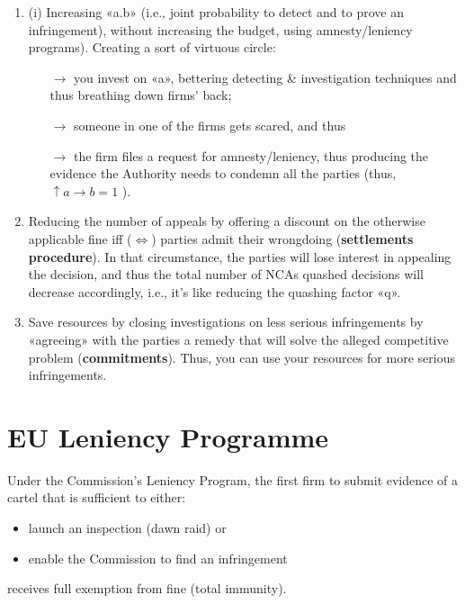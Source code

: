             \begin{enumerate}
                \item (i) Increasing «a.b» (i.e., joint probability to detect and to prove an infringement), without increasing the budget, using amnesty/leniency programs). Creating a sort of virtuous circle: 
                \begin{itemize}
                    \item[\(\rightarrow\)] you invest on «a», bettering detecting \& investigation techniques and thus breathing down firms’ back; 
                    \item[\(\rightarrow\)] someone in one of the firms gets scared, and thus
                    \item[\(\rightarrow\)]the firm files a request for amnesty/leniency, thus producing the evidence the Authority needs to condemn all the parties (thus, $\uparrow a \rightarrow b= 1$ ).
                \end{itemize}
                \item Reducing the number of appeals by offering a discount on the otherwise applicable fine iff (\(\iff\)) parties admit their wrongdoing (\textbf{settlements procedure}). In that circumstance, the parties will lose interest in appealing the decision, and thus the total number of NCAs quashed decisions will decrease accordingly, i.e., it’s like reducing the quashing factor «q».
                \item Save resources by closing investigations on less serious infringements by «agreeing» with the parties a remedy that will solve the alleged competitive problem (\textbf{commitments}). Thus, you can use your resources for more serious infringements.
            \end{enumerate}

\section{EU Leniency Programme}

    Under the Commission's Leniency Program, the first firm to submit evidence of a cartel that is sufficient to either:
        \begin{itemize}
            \item launch an inspection (dawn raid) or
            \item enable the Commission to find an infringement
        \end{itemize}
    receives full exemption from fine (total immunity).
    
